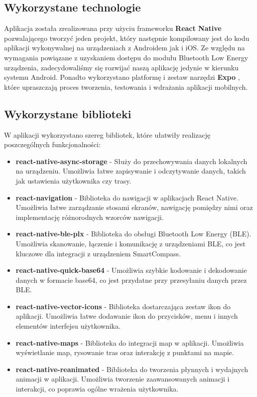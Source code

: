 \subsection{Wykorzystane technologie}
Aplikacja została zrealizowana przy użyciu frameworku \textbf{React Native} \cite{react-native-docs} pozwalającego tworzyć jeden projekt, który następnie kompilowany jest do kodu aplikacji wykonywalnej na urządzeniach z Androidem jak i iOS. Ze względu na wymagania powiązane z uzyskaniem dostępu do modułu Bluetooth Low Energy urządzenia, zadecydowaliśmy się rozwijać naszą aplikację jedynie w kierunku systemu Android.
Ponadto wykorzystano platformę i zestaw narzędzi \textbf{Expo} \cite{expo-docs}, które upraszczają proces tworzenia, testowania i wdrażania aplikacji mobilnych.

\subsection{Wykorzystane biblioteki}

W aplikacji wykorzystano szereg bibliotek, które ułatwiły realizację poszczególnych funkcjonalności:

\begin{itemize}
    \item \textbf{react-native-async-storage} - Służy do przechowywania danych lokalnych na urządzeniu. Umożliwia łatwe zapisywanie i odczytywanie danych, takich jak ustawienia użytkownika czy trasy.
    \item \textbf{react-navigation} - Biblioteka do nawigacji w aplikacjach React Native. Umożliwia łatwe zarządzanie stosami ekranów, nawigację pomiędzy nimi oraz implementację różnorodnych wzorców nawigacji.
    \item \textbf{react-native-ble-plx} - Biblioteka do obsługi Bluetooth Low Energy (BLE). Umożliwia skanowanie, łączenie i komunikację z urządzeniami BLE, co jest kluczowe dla integracji z urządzeniem SmartCompass.
    \item \textbf{react-native-quick-base64} - Umożliwia szybkie kodowanie i dekodowanie danych w formacie base64, co jest przydatne przy przesyłaniu danych przez BLE.
    \item \textbf{react-native-vector-icons} - Biblioteka dostarczająca zestaw ikon do aplikacji. Umożliwia łatwe dodawanie ikon do przycisków, menu i innych elementów interfejsu użytkownika.
    \item \textbf{react-native-maps} - Biblioteka do integracji map w aplikacji. Umożliwia wyświetlanie map, rysowanie tras oraz interakcję z punktami na mapie.
    \item \textbf{react-native-reanimated} - Biblioteka do tworzenia płynnych i wydajnych animacji w aplikacji. Umożliwia tworzenie zaawansowanych animacji i interakcji, co poprawia ogólne wrażenia użytkownika.
\end{itemize}

